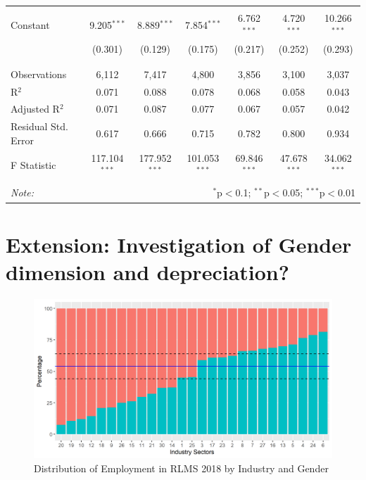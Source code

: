 \documentclass[12pt,a4paper]{article}
\numberwithin{equation}{section}
\begin{document}
{\begin{table}[!htbp]
\begin{tabular}{@{\extracolsep{5pt}}p{3cm}cccccc}
  & & & & & & \\ 
 Constant & 9.205$^{***}$ & 8.889$^{***}$ & 7.854$^{***}$ & 6.762$^{***}$ & 4.720$^{***}$ & 10.266$^{***}$ \\ 
  & (0.301) & (0.129) & (0.175) & (0.217) & (0.252) & (0.293) \\ 
  & & & & & & \\ 
\hline \\[-1.8ex] 
Observations & 6,112 & 7,417 & 4,800 & 3,856 & 3,100 & 3,037 \\ 
R$^{2}$ & 0.071 & 0.088 & 0.078 & 0.068 & 0.058 & 0.043 \\ 
Adjusted R$^{2}$ & 0.071 & 0.087 & 0.077 & 0.067 & 0.057 & 0.042 \\ 
Residual Std. Error & 0.617 & 0.666 & 0.715 & 0.782 & 0.800 & 0.934 \\ 
F Statistic & 117.104$^{***}$ & 177.952$^{***}$ & 101.053$^{***}$ & 69.846$^{***}$ & 47.678$^{***}$ & 34.062$^{***}$ \\ 
\hline 
\hline \\[-1.8ex] 
\textit{Note:}  & \multicolumn{6}{r}{$^{*}$p$<$0.1; $^{**}$p$<$0.05; $^{***}$p$<$0.01} \\ 
\end{tabular} 
\end{table} 







\section{Extension: Investigation of Gender dimension and depreciation?}



\begin{figure}[H]
     \centering
     \hspace*{-0.7in}
     \includegraphics{gen_ind18.png}
  \caption{Distribution of Employment in RLMS 2018 by Industry and Gender}\label{fig:5}
\end{figure}



}
\end{document}
